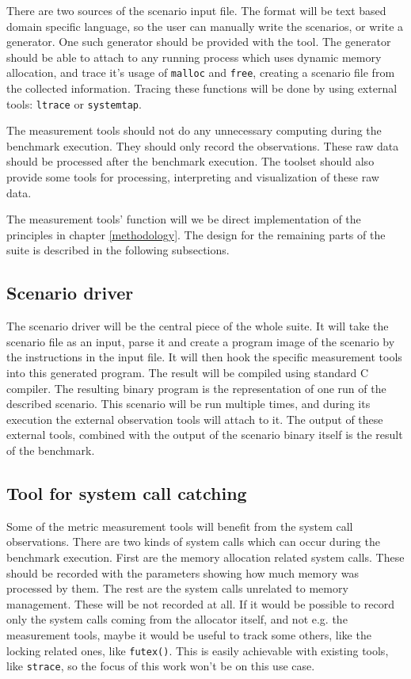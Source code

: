 There are two sources of the scenario input file. The format will be text based domain specific language, so the user can manually write the scenarios, or write a generator. One such generator should be provided with the tool. The generator should be able to attach to any running process which uses dynamic memory allocation, and trace it's usage of {\tt malloc} and {\tt free}, creating a scenario file from the collected information. Tracing these functions will be done by using external tools: {\tt ltrace} or {\tt systemtap}.

The measurement tools should not do any unnecessary computing during the benchmark execution. They should only record the observations. These raw data should be processed after the benchmark execution. The toolset should also provide some tools for processing, interpreting and visualization of these raw data.

The measurement tools' function will we be direct implementation of the principles in chapter \ref{methodology}. The design for the remaining parts of the suite is described in the following subsections.

\subsection{Scenario driver}

The scenario driver will be the central piece of the whole suite. It will take the scenario file as an input, parse it and create a program image of the scenario by the instructions in the input file. It will then hook the specific measurement tools into this generated program. The result will be compiled using standard C compiler. The resulting binary program is the representation of one run of the described scenario. This scenario will be run multiple times, and during its execution the external observation tools will attach to it. The output of these external tools, combined with the output of the scenario binary itself is the result of the benchmark.

\subsection{Tool for system call catching}

Some of the metric measurement tools will benefit from the system call observations. There are two kinds of system calls which can occur during the benchmark execution. First are the memory allocation related system calls. These should be recorded with the parameters showing how much memory was processed by them. The rest are the system calls unrelated to memory management. These will be not recorded at all. If it would be possible to record only the system calls coming from the allocator itself, and not e.g. the measurement tools, maybe it would be useful to track some others, like the locking related ones, like {\tt futex()}. This is easily achievable with existing tools, like {\tt strace}, so the focus of this work won't be on this use case.

